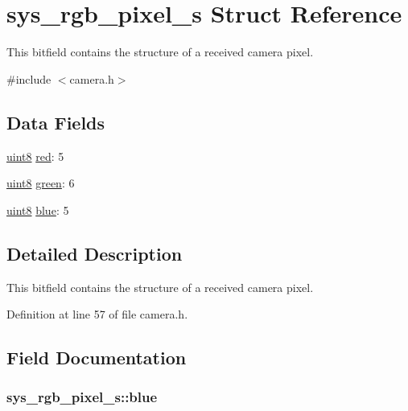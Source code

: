 \hypertarget{structsys__rgb__pixel__s}{}\section{sys\+\_\+rgb\+\_\+pixel\+\_\+s Struct Reference}
\label{structsys__rgb__pixel__s}


This bitfield contains the structure of a received camera pixel.  




{\ttfamily \#include $<$camera.\+h$>$}

\subsection*{Data Fields}
\begin{DoxyCompactItemize}
\item 
\hyperlink{definitions_8h_adde6aaee8457bee49c2a92621fe22b79}{uint8} \hyperlink{structsys__rgb__pixel__s_a8f0985f9f96d4c7a6723aa10dcacc93b}{red}\+: 5
\item 
\hyperlink{definitions_8h_adde6aaee8457bee49c2a92621fe22b79}{uint8} \hyperlink{structsys__rgb__pixel__s_aad4178b262be3365f99a3cadece2f528}{green}\+: 6
\item 
\hyperlink{definitions_8h_adde6aaee8457bee49c2a92621fe22b79}{uint8} \hyperlink{structsys__rgb__pixel__s_a92b6e3779404cee9fde835ba597f22c7}{blue}\+: 5
\end{DoxyCompactItemize}


\subsection{Detailed Description}
This bitfield contains the structure of a received camera pixel. 

Definition at line 57 of file camera.\+h.



\subsection{Field Documentation}
\hypertarget{structsys__rgb__pixel__s_a92b6e3779404cee9fde835ba597f22c7}{}
\subsubsection[{blue}]{ sys\+\_\+rgb\+\_\+pixel\+\_\+s\+::blue}\label{structsys__rgb__pixel__s_a92b6e3779404cee9fde835ba597f22c7}


